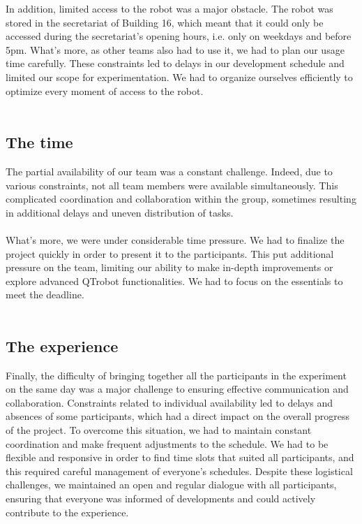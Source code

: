 \newpage
In addition, limited access to the robot was a major obstacle. The robot was stored in the secretariat of Building 16, which meant that it could only be accessed during the secretariat's opening hours, i.e. only on weekdays and before 5pm. What's more, as other teams also had to use it, we had to plan our usage time carefully. These constraints led to delays in our development schedule and limited our scope for experimentation. We had to organize ourselves efficiently to optimize every moment of access to the robot.\\
\\
\subsection{The time}
The partial availability of our team was a constant challenge. Indeed, due to various constraints, not all team members were available simultaneously. This complicated coordination and collaboration within the group, sometimes resulting in additional delays and uneven distribution of tasks.\\
\\
What's more, we were under considerable time pressure. We had to finalize the project quickly in order to present it to the participants. This put additional pressure on the team, limiting our ability to make in-depth improvements or explore advanced QTrobot functionalities. We had to focus on the essentials to meet the deadline.\\
\\
\subsection{The experience}
Finally, the difficulty of bringing together all the participants in the experiment on the same day was a major challenge to ensuring effective communication and collaboration. Constraints related to individual availability led to delays and absences of some participants, which had a direct impact on the overall progress of the project. To overcome this situation, we had to maintain constant coordination and make frequent adjustments to the schedule. We had to be flexible and responsive in order to find time slots that suited all participants, and this required careful management of everyone's schedules. Despite these logistical challenges, we maintained an open and regular dialogue with all participants, ensuring that everyone was informed of developments and could actively contribute to the experience.\\
\\

